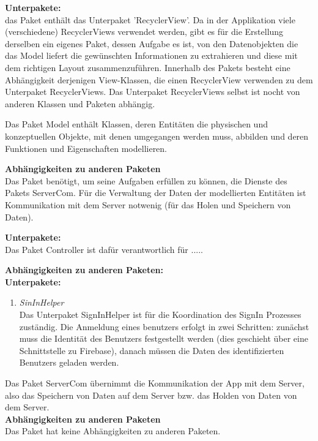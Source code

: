 \textbf{Unterpakete:}\\
das Paket enthält das Unterpaket 'RecyclerView'. Da in der Applikation viele (verschiedene) RecyclerViews verwendet werden, gibt es für die Erstellung derselben ein eigenes Paket, dessen Aufgabe es ist, von den Datenobjekten die das Model liefert die gewünschten Informationen zu extrahieren und diese mit dem richtigen Layout zusammenzuführen. Innerhalb des Pakets besteht eine Abhängigkeit derjenigen View-Klassen, die einen RecyclerView verwenden zu dem Unterpaket RecyclerViews. Das Unterpaket RecyclerViews selbst ist nocht von anderen Klassen und Paketen abhängig.

Das Paket Model enthält Klassen, deren Entitäten die physischen und konzeptuellen Objekte, mit denen umgegangen werden muss, abbilden und deren Funktionen und Eigenschaften modellieren.

\textbf{Abhängigkeiten zu anderen Paketen}\\
Das Paket benötigt, um seine Aufgaben erfüllen zu können, die Dienste des Pakets ServerCom. Für die Verwaltung der Daten der modellierten Entitäten ist Kommunikation mit dem Server notwenig (für das Holen und Speichern von Daten).

\textbf{Unterpakete:}\\

Das Paket Controller ist dafür verantwortlich für .....

\textbf{Abhängigkeiten zu anderen Paketen:}\\


\textbf{Unterpakete:}\\
\begin{enumerate}
	\item \textit{SinInHelper}\\
	Das Unterpaket SignInHelper ist für die Koordination des SignIn Prozesses zuständig. Die Anmeldung eines benutzers erfolgt in zwei Schritten: zunächst muss die Identität des Benutzers festgestellt werden (dies geschieht über eine Schnittstelle zu Firebase), danach müssen die Daten des identifizierten Benutzers geladen werden.
\end{enumerate}

Das Paket ServerCom übernimmt die Kommunikation der App mit dem Server, also das Speichern von Daten auf dem Server bzw. das Holden von Daten von dem Server.\\

\textbf{Abhängigkeiten zu anderen Paketen}\\
Das Paket hat keine Abhängigkeiten zu anderen Paketen.


